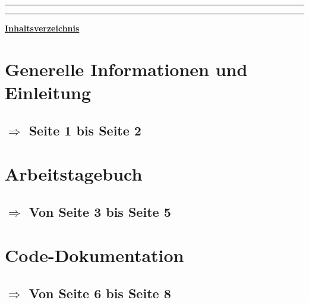 \documentclass[a4paper, 10pt, oneside]{article} %
\begin{document}
\begin{titlepage}
	\vspace{0.1\textheight} %
	
	
	\rule{\textwidth}{0.4pt} %
	
	\vspace{2pt}\vspace{-\baselineskip} %
	
	\rule{\textwidth}{1pt} %
	
\end{titlepage}

\restoregeometry





\huge{\underline{\textbf{Inhaltsverzeichnis}}}
\newline

\section{Generelle Informationen und Einleitung}
\subsection*{$\Rightarrow$ Seite 1 bis Seite 2 }
\vspace*{4mm}


\section{Arbeitstagebuch}
\subsection*{$\Rightarrow$ Von Seite 3 bis Seite 5}
\vspace*{4mm}

\section{Code-Dokumentation}
\subsection*{$\Rightarrow$ Von Seite 6 bis Seite 8}
\vspace*{4mm}
\end{document}
